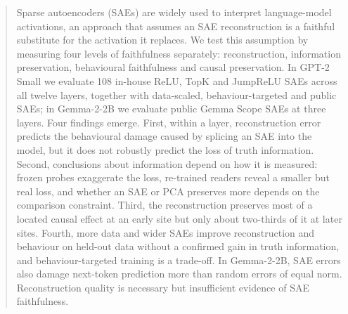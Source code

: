 \begin{abstract}
Sparse autoencoders (SAEs) are widely used to interpret language-model activations, an approach that assumes an SAE
reconstruction is a faithful substitute for the activation it replaces. We test this assumption by measuring four
levels of faithfulness separately: reconstruction, information preservation, behavioural faithfulness and causal
preservation. In GPT-2 Small we evaluate 108 in-house ReLU, TopK and JumpReLU SAEs across all twelve layers, together
with data-scaled, behaviour-targeted and public SAEs; in Gemma-2-2B we evaluate public Gemma Scope SAEs at three layers.
Four findings emerge. First, within a layer, reconstruction error predicts the behavioural damage caused by splicing an
SAE into the model, but it does not robustly predict the loss of truth information. Second, conclusions about
information depend on how it is measured: frozen probes exaggerate the loss, re-trained readers reveal a smaller but
real loss, and whether an SAE or PCA preserves more depends on the comparison constraint. Third, the reconstruction
preserves most of a located causal effect at an early site but only about two-thirds of it at later sites. Fourth,
more data and wider SAEs improve reconstruction and behaviour on held-out data without a confirmed gain in truth
information, and behaviour-targeted training is a trade-off. In Gemma-2-2B, SAE errors also damage next-token
prediction more than random errors of equal norm. Reconstruction quality is necessary but insufficient evidence of
SAE faithfulness.
\end{abstract}
